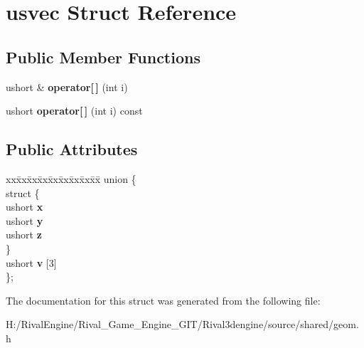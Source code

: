 \hypertarget{structusvec}{}\section{usvec Struct Reference}
\label{structusvec}
\subsection*{Public Member Functions}
\begin{DoxyCompactItemize}
\item 
\mbox{\label{structusvec_abade077421cd7ef38361bfcc90b621ee}} 
ushort \& {\bfseries operator\mbox{[}$\,$\mbox{]}} (int i)
\item 
\mbox{\label{structusvec_a1ca4f09814b0a5982fc69ed3d23a3602}} 
ushort {\bfseries operator\mbox{[}$\,$\mbox{]}} (int i) const
\end{DoxyCompactItemize}
\subsection*{Public Attributes}
\begin{DoxyCompactItemize}
\item 
\mbox{\label{structusvec_aae83b6956bb07233486cff4721490f3f}} 
\begin{tabbing}
xx\=xx\=xx\=xx\=xx\=xx\=xx\=xx\=xx\=\kill
union \{\\
\mbox{\label{unionusvec_1_1_0D213_a2b9d1eeb97f177cba3ffb36028cd68dd}} 
\>struct \{\\
\>\>ushort {\bfseries x}\\
\>\>ushort {\bfseries y}\\
\>\>ushort {\bfseries z}\\
\>\} \\
\>ushort {\bfseries v} \mbox{[}3\mbox{]}\\
\}; \\

\end{tabbing}\end{DoxyCompactItemize}


The documentation for this struct was generated from the following file\+:\begin{DoxyCompactItemize}
\item 
H\+:/\+Rival\+Engine/\+Rival\+\_\+\+Game\+\_\+\+Engine\+\_\+\+G\+I\+T/\+Rival3dengine/source/shared/geom.\+h\end{DoxyCompactItemize}
